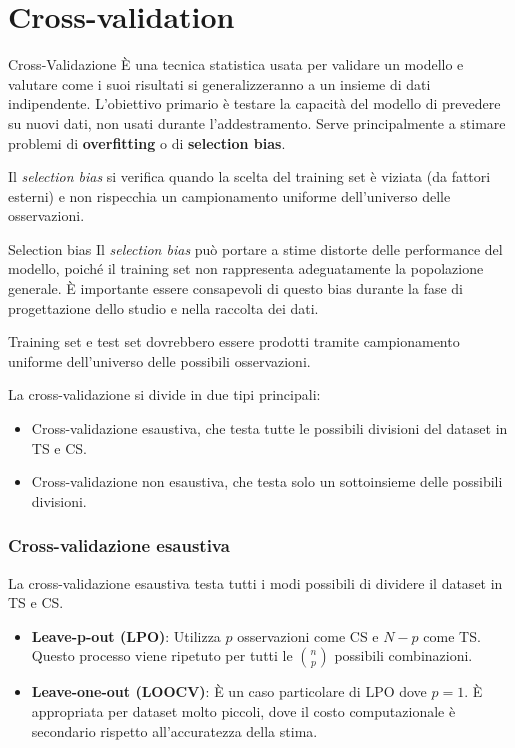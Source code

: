 \section{Cross-validation}

\begin{definizione}{Cross-Validazione}{}
È una tecnica statistica usata per validare un modello e valutare come
i suoi risultati si generalizzeranno a un insieme di dati indipendente.
L'obiettivo primario è testare la capacità del modello di prevedere su nuovi
dati, non usati durante l'addestramento.
Serve principalmente a stimare problemi di \textbf{overfitting} o di
\textbf{selection bias}.
\end{definizione}

Il \textit{selection bias} si verifica quando la scelta del training
set è viziata (da fattori esterni) e non rispecchia un campionamento
uniforme dell'universo delle osservazioni.

\begin{nota}{Selection bias}
Il \textit{selection bias} può portare a stime distorte delle performance
del modello, poiché il training set non rappresenta adeguatamente la
popolazione generale.
È importante essere consapevoli di questo bias durante la fase di
progettazione dello studio e nella raccolta dei dati.

Training set e test set dovrebbero essere prodotti tramite campionamento
uniforme dell'universo delle possibili osservazioni.
\end{nota}

La cross-validazione si divide in due tipi principali:
\begin{itemize}
    \item Cross-validazione esaustiva, che testa tutte le possibili divisioni
    del dataset in TS e CS.
    \item Cross-validazione non esaustiva, che testa solo un sottoinsieme delle
    possibili divisioni.
\end{itemize}

\subsubsection{Cross-validazione esaustiva}
La cross-validazione esaustiva testa tutti i modi possibili di dividere il dataset in TS e CS.
\begin{itemize}
    \item \textbf{Leave-p-out (LPO)}: Utilizza $p$ osservazioni come
    CS e $N-p$ come TS. Questo processo viene ripetuto per tutti le
    $\binom{n}{p}$ possibili combinazioni.
    \item \textbf{Leave-one-out (LOOCV)}: È un caso particolare di LPO
    dove $p=1$. È appropriata per dataset molto piccoli, dove il
    costo computazionale è secondario rispetto all'accuratezza della stima.
\end{itemize}

